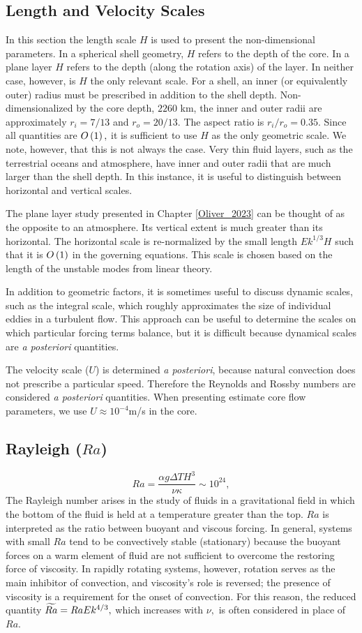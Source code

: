 \subsection*{Length and Velocity Scales}
In this section the length scale $H$ is used to present the non-dimensional parameters. In a spherical shell geometry, $H$ refers to the depth of the core. 
In a plane layer $H$ refers to the depth (along the rotation axis) of the layer. 
In neither case, however, is $H$ the only relevant scale. 
For a shell, an inner (or equivalently outer) radius must be prescribed in addition to the shell depth. 
 Non-dimensionalized by the core depth, $2260$ km, the inner and outer radii are approximately $r_i = 7/13$ and $r_{o}= 20/13.$ The aspect ratio is $r_{i}/r_{o} = 0.35.$ 
 Since all quantities are $O\left ( 1\right ),$ it is sufficient to use $H$ as the only geometric scale.
 We note, however, that this is not always the case. 
 Very thin fluid layers, such as the terrestrial oceans and atmosphere, have inner and outer radii that are much larger than the shell depth. In this instance, it is useful to distinguish between horizontal and vertical scales.

  The plane layer study presented in Chapter \ref{Oliver_2023} can be thought of as the opposite to an atmosphere. Its vertical extent is much greater than its horizontal. The horizontal scale is re-normalized by the small length $Ek^{1/3}H$ such that it is $O\left ( 1\right ) $ in the governing equations. 
  This scale is chosen based on the length of the unstable modes from linear theory.

  In addition to geometric factors, it is sometimes useful to discuss dynamic scales, such as the integral scale, which roughly approximates the size of individual eddies in a turbulent flow.
  This approach can be useful to determine the scales on which particular forcing terms balance, but it is difficult because dynamical scales are \textit{a posteriori} quantities.

   The velocity scale ($U$) is determined \textit{a posteriori}, because natural convection does not prescribe a particular speed. Therefore the Reynolds and Rossby numbers are considered \textit{a posteriori} quantities. 
   When presenting estimate core flow parameters, we use $U\approx  10^{-4}$m/s in the core.
\subsection*{Rayleigh ($Ra$)}
\[Ra = \frac{\alpha g\Delta T H^{3}}{\nu\kappa}\sim10^{24},\]
 The Rayleigh number arises in the study of fluids in a gravitational field in which the bottom of the fluid is held at a temperature greater than the top. $Ra$ is interpreted as the ratio between buoyant and viscous forcing. In general, systems with small $Ra$ tend to be convectively stable (stationary) because the buoyant forces on a warm element of fluid are not sufficient to overcome the restoring force of viscosity. In rapidly rotating systems, however, rotation serves as the main inhibitor of convection, and viscosity's role is reversed; the presence of viscosity is a requirement for the onset of convection. For this reason, the reduced quantity $\widetilde{Ra} = Ra Ek ^{4/3},$ which increases with $\nu,$ is often considered in place of $Ra.$
